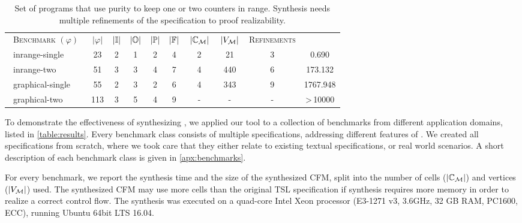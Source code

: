 \begin{table}[htbp]
\centering
\caption{Set of programs that use purity to keep one or two counters
  in range. Synthesis needs multiple refinements of the specification
  to proof realizability.}
\label{table:results2}
\begin{tabular}{|l||c|c|c|c|c||c|c|c|c|}
\hline
  \multicolumn{1}{|c||}{\multirow{2}{*}{\ \textsc{Benchmark} $ (\varphi) $\ }}
  & \multicolumn{1}{c|}{\multirow{2}{*}{\;$| \varphi |$\;}}
  & \multicolumn{1}{c|}{\multirow{2}{*}{\;$| \mathbb{I} |$\;}}
  & \multicolumn{1}{c|}{\multirow{2}{*}{\;$| \mathbb{O} |$\;}}
  & \multicolumn{1}{c|}{\multirow{2}{*}{\;$| \mathbb{P} |$\;}}
  & \multicolumn{1}{c||}{\multirow{2}{*}{\;$| \mathbb{F} |$\;}}

  & \multicolumn{1}{c|}{\multirow{2}{*}{\,$| \mathbb{C}_{\mathcal{M}} |$\,}}
  & \multicolumn{1}{c|}{\multirow{2}{*}{\,$| V_{\mathcal{M}} |$\,}}
  & \multicolumn{1}{c|}{\multirow{2}{*}{\textsc{Refinements}}}
  & \multicolumn{1}{c|}{\raisebox{-2pt}{\;\textsc{Synthesis}\;}}
  \\
&&&&&&&&&\raisebox{0pt}{\textsc{Time (s)}}\\
\hline \hline
\ inrange-single  & 23 & 2  & 1 & 2 & 4 & 2 & 21 & 3 & 0.690 \\ %
\ inrange-two  & 51 & 3 &  3 & 4 & 7 & 4 & 440 & 6 & 173.132 \\ %
\ graphical-single  & 55 & 2 & 3 & 2 & 6 & 4 & 343 & 9 & 1767.948 \\ %
\ graphical-two  & 113 & 3 &  5 & 4 & 9 & -  & - & - & >\,10000 \\ %
\hline
\end{tabular}
\end{table}


To demonstrate the effectiveness of synthesizing \TSL, we applied our
tool to a collection of benchmarks from different application domains,
listed in \cref{table:results}.  Every benchmark class consists of
multiple specifications, addressing different features of \TSL.  We
created all specifications from scratch, where we took care that they
either relate to existing textual specifications, or real world
scenarios. A short description of each benchmark class is given in
\cref{apx:benchmarks}.

For every benchmark, we report the synthesis time and the size of the
synthesized CFM, split into the number of cells
($ | \mathbb{C}_{\mathcal{M}} | $) and vertices ($ | V_{\mathcal{M}} | $) used.
The synthesized CFM may use more cells than the original TSL
specification if synthesis requires more memory in order to realize a
correct control flow.
%
The synthesis was executed on a quad-core Intel Xeon processor
(E3-1271 v3, 3.6GHz, 32 GB RAM, PC1600, ECC), running
Ubuntu 64bit LTS 16.04.

